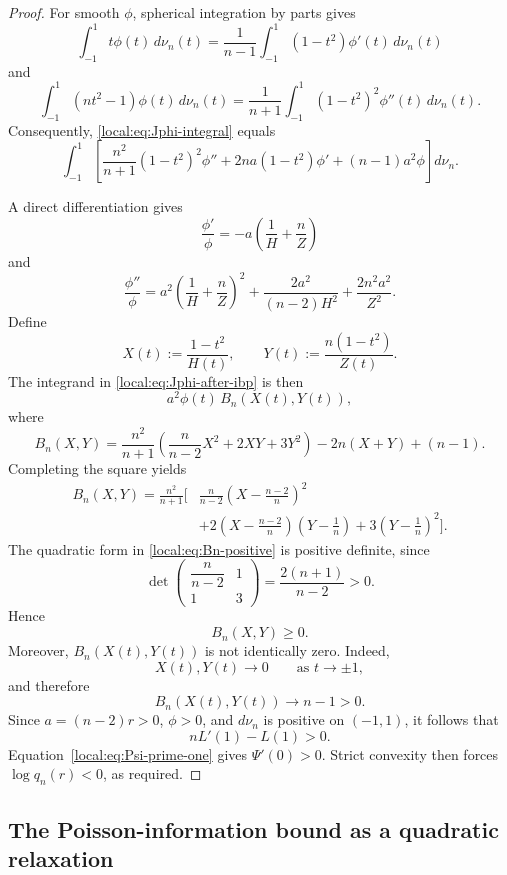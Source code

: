 \documentclass[11pt,reqno]{amsart}
\theoremstyle{remark}
\begin{document}
\begin{proof}
For smooth \(\phi\), spherical integration by parts gives
\begin{equation}\label{local:eq:spherical-ibp-first}
\int_{-1}^1 t\phi(t)\,d\nu_n(t)
=
\frac{1}{n-1}
\int_{-1}^1
(1-t^2)\phi'(t)\,d\nu_n(t)
\end{equation}
and
\begin{equation}\label{local:eq:spherical-ibp-second}
\int_{-1}^1 (nt^2-1)\phi(t)\,d\nu_n(t)
=
\frac{1}{n+1}
\int_{-1}^1
(1-t^2)^2\phi''(t)\,d\nu_n(t).
\end{equation}
Consequently, \eqref{local:eq:Jphi-integral} equals
\begin{equation}\label{local:eq:Jphi-after-ibp}
\int_{-1}^1
\left[
\frac{n^2}{n+1}(1-t^2)^2\phi''
+2na(1-t^2)\phi'
+(n-1)a^2\phi
\right]
d\nu_n.
\end{equation}

A direct differentiation gives
\[
\frac{\phi'}{\phi}
=
-a\left(\frac1H+\frac nZ\right)
\]
and
\[
\frac{\phi''}{\phi}
=
a^2\left(\frac1H+\frac nZ\right)^2
+
\frac{2a^2}{(n-2)H^2}
+
\frac{2n^2a^2}{Z^2}.
\]
Define
\[
X(t):=\frac{1-t^2}{H(t)},
\qquad
Y(t):=\frac{n(1-t^2)}{Z(t)}.
\]
The integrand in \eqref{local:eq:Jphi-after-ibp} is then
\[
a^2\phi(t)\,B_n(X(t),Y(t)),
\]
where
\[
B_n(X,Y)
=
\frac{n^2}{n+1}
\left(
\frac{n}{n-2}X^2+2XY+3Y^2
\right)
-2n(X+Y)+(n-1).
\]
Completing the square yields
\begin{align}
B_n(X,Y)
=
\frac{n^2}{n+1}
\Bigg[
&
\frac{n}{n-2}
\left(
X-\frac{n-2}{n}
\right)^2
\nonumber\\
&+
2
\left(
X-\frac{n-2}{n}
\right)
\left(
Y-\frac1n
\right)
+
3
\left(
Y-\frac1n
\right)^2
\Bigg].
\label{local:eq:Bn-positive}
\end{align}
The quadratic form in \eqref{local:eq:Bn-positive} is positive definite, since
\[
\det
\begin{pmatrix}
\dfrac{n}{n-2} & 1\\[1mm]
1 & 3
\end{pmatrix}
=
\frac{2(n+1)}{n-2}>0.
\]
Hence
\[
B_n(X,Y)\ge0.
\]
Moreover, \(B_n(X(t),Y(t))\) is not identically zero. Indeed,
\[
X(t),Y(t)\longrightarrow0
\qquad\text{as }t\to\pm1,
\]
and therefore
\[
B_n(X(t),Y(t))\longrightarrow n-1>0.
\]
Since \(a=(n-2)r>0\), \(\phi>0\), and \(d\nu_n\) is positive on
\((-1,1)\), it follows that
\[
nL'(1)-L(1)>0.
\]
Equation~\eqref{local:eq:Psi-prime-one} gives $\Psi'(0)>0$.
Strict convexity then forces $\log q_n(r)<0$, as required.
\end{proof}

\subsection{The Poisson-information bound as a quadratic relaxation}
\end{document}
